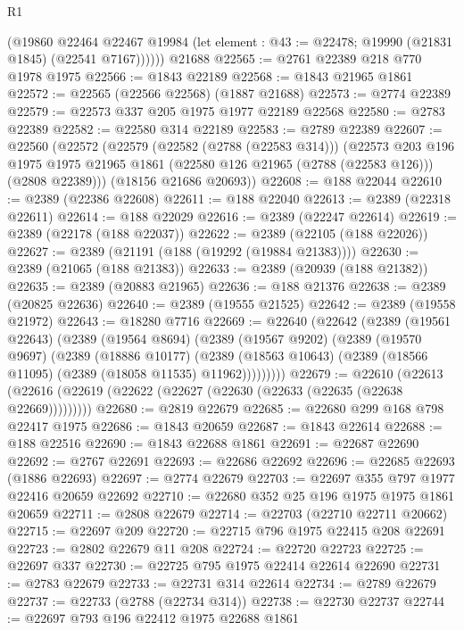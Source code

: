 \begin{lexlean}{R1}
\begin{coremodule}
          (@19860
            @22464
            @22467
            @19984
            (let element : @43 := @22478; @19990 (@21831 @1845) (@22541 @7167))))))
    @21688
@22565 := @2761 @22389 @218 @770 @1978 @1975
@22566 := @1843 @22189
@22568 := @1843 @21965 @1861
@22572 := @22565 (@22566 @22568) (@1887 @21688)
@22573 := @2774 @22389
@22579 := @22573 @337 @205 @1975 @1977 @22189 @22568
@22580 := @2783 @22389
@22582 := @22580 @314 @22189
@22583 := @2789 @22389
@22607 := @22560
    (@22572
      (@22579
        (@22582 (@2788 (@22583 @314)))
        (@22573
          @203
          @196
          @1975
          @1975
          @21965
          @1861
          (@22580 @126 @21965 (@2788 (@22583 @126)))
          (@2808 @22389)))
      (@18156 @21686 @20693))
@22608 := @188 @22044
@22610 := @2389 (@22386 @22608)
@22611 := @188 @22040
@22613 := @2389 (@22318 @22611)
@22614 := @188 @22029
@22616 := @2389 (@22247 @22614)
@22619 := @2389 (@22178 (@188 @22037))
@22622 := @2389 (@22105 (@188 @22026))
@22627 := @2389 (@21191 (@188 (@19292 (@19884 @21383))))
@22630 := @2389 (@21065 (@188 @21383))
@22633 := @2389 (@20939 (@188 @21382))
@22635 := @2389 (@20883 @21965)
@22636 := @188 @21376
@22638 := @2389 (@20825 @22636)
@22640 := @2389 (@19555 @21525)
@22642 := @2389 (@19558 @21972)
@22643 := @18280 @7716
@22669 := @22640
    (@22642
      (@2389
        (@19561 @22643)
        (@2389
          (@19564 @8694)
          (@2389
            (@19567 @9202)
            (@2389
              (@19570 @9697)
              (@2389
                (@18886 @10177)
                (@2389 (@18563 @10643) (@2389 (@18566 @11095) (@2389 (@18058 @11535) @11962)))))))))
@22679 := @22610
    (@22613 (@22616 (@22619 (@22622 (@22627 (@22630 (@22633 (@22635 (@22638 @22669)))))))))
@22680 := @2819 @22679
@22685 := @22680 @299 @168 @798 @22417 @1975
@22686 := @1843 @20659
@22687 := @1843 @22614
@22688 := @188 @22516
@22690 := @1843 @22688 @1861
@22691 := @22687 @22690
@22692 := @2767 @22691
@22693 := @22686 @22692
@22696 := @22685 @22693 (@1886 @22693)
@22697 := @2774 @22679
@22703 := @22697 @355 @797 @1977 @22416 @20659 @22692
@22710 := @22680 @352 @25 @196 @1975 @1975 @1861 @20659
@22711 := @2808 @22679
@22714 := @22703 (@22710 @22711 @20662)
@22715 := @22697 @209
@22720 := @22715 @796 @1975 @22415 @208 @22691
@22723 := @2802 @22679 @11 @208
@22724 := @22720 @22723
@22725 := @22697 @337
@22730 := @22725 @795 @1975 @22414 @22614 @22690
@22731 := @2783 @22679
@22733 := @22731 @314 @22614
@22734 := @2789 @22679
@22737 := @22733 (@2788 (@22734 @314))
@22738 := @22730 @22737
@22744 := @22697 @793 @196 @22412 @1975 @22688 @1861

\end{coremodule}
\end{lexlean}
